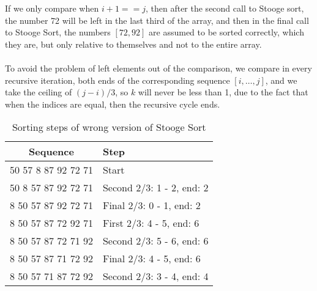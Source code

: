 \documentclass[12pt]{scrartcl}
\begin{document}
\begin{enumerate}
	If we only compare when $i + 1 == j$, then after the second call to Stooge sort, the number 72 will be left in the last third of the array, and then in the final call to Stooge Sort, the numbers $[72, 92]$ are assumed to be sorted correctly, which they are, but only relative to themselves and not to the entire array. \\
	\\
	To avoid the problem of left elements out of the comparison, we compare in every recursive iteration, both ends of the corresponding sequence $[i, \ldots, j]$, and we take the ceiling of $(j - i)/3$, so $k$ will never be less than 1, due to the fact that when the indices are equal, then the recursive cycle ends.
	
	\begin{table}[ht!]
	\caption{Sorting steps of wrong version of Stooge Sort}
	\centering
	\begin{tabular}{|c|l|}
	\hline
	Sequence			&	Step\\
	\hline
	50 57 8 87 92 72 71 	&	Start\\
	50 8 57 87 92 72 71 	& Second 2/3: 1 - 2, end: 2 \\
	8 50 57 87 92 72 71  & Final 2/3: 0 - 1, end: 2\\
	8 50 57 87 72 92 71 	& First 2/3: 4 - 5, end: 6\\
	8 50 57 87 72 71 92 	& Second 2/3: 5 - 6, end: 6\\	
	8 50 57 87 71 72 92  & Final 2/3: 4 - 5, end: 6\\
	8 50 57 71 87 72 92  & Second 2/3: 3 - 4, end: 4\\
	\hline
	\end{tabular}
		\label{wrongStoogeSteps}
	\end{table}


\end{enumerate}
\end{document}
